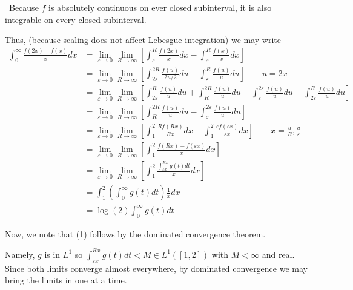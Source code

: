 \documentclass[12pt]{Qual}
\begin{document}
\begin{solution}$\,$
Because $f$ is absolutely continuous on ever closed subinterval, it is also integrable on every closed subinterval.

Thus, (because scaling does not affect Lebesgue integration) we may write \begin{align*}
    \int_0^\infty\frac{f(2x)-f(x)}{x}dx&=\lim_{\varepsilon\to0}\lim_{R\to\infty}\left[\int_\varepsilon^R\frac{f(2x)}{x}dx-\int_\varepsilon^R\frac{f(x)}{x}dx\right]\\
    &=\lim_{\varepsilon\to0}\lim_{R\to\infty}\left[\int_{2\varepsilon}^{2R}\frac{f(u)}{2u/2}du-\int_\varepsilon^R\frac{f(u)}{u}du\right]\qquad u=2x\\
    &=\lim_{\varepsilon\to0}\lim_{R\to\infty}\left[\int_{2\varepsilon}^{R}\frac{f(u)}{u}du+\int_R^{2R}\frac{f(u)}{u}du-\int_\varepsilon^{2\varepsilon}\frac{f(u)}{u}du-\int_{2\varepsilon}^R\frac{f(u)}{u}du\right]\\
    &=\lim_{\varepsilon\to0}\lim_{R\to\infty}\left[\int_R^{2R}\frac{f(u)}{u}du-\int_\varepsilon^{2\varepsilon}\frac{f(u)}{u}du\right]\\
    &=\lim_{\varepsilon\to0}\lim_{R\to\infty}\left[\int_1^2\frac{Rf(Rx)}{Rx}dx-\int_1^2\frac{\varepsilon f(\varepsilon x)}{\varepsilon x}dx\right]\qquad x=\frac{u}{R},\frac{u}{\varepsilon} \\
    &=\lim_{\varepsilon\to0}\lim_{R\to\infty}\left[\int_1^2\frac{f(Rx)-f(\varepsilon x)}{x}dx\right]\\
    &=\lim_{\varepsilon\to0}\lim_{R\to\infty}\left[\int_1^2\frac{\int_{\varepsilon x}^{R x}g(t)dt}{x}dx\right]\\
    &=\int_1^2\left(\int_0^\infty g(t)dt\right)\frac{1}{x}dx\tag{1}\\
    &=\log(2)\int_0^\infty g(t)dt
\end{align*}

Now, we note that (1) follows by the dominated convergence theorem.

Namely, $g$ is in $L^1$ so $\displaystyle \int_{\varepsilon x}^{R x}g(t)dt<M\in L^1([1,2])$ with $M<\infty$ and real. Since both limits converge almost everywhere, by dominated convergence we may bring the limits in one at a time.
\end{solution}
\vspace{0.5cm}
\end{document}
